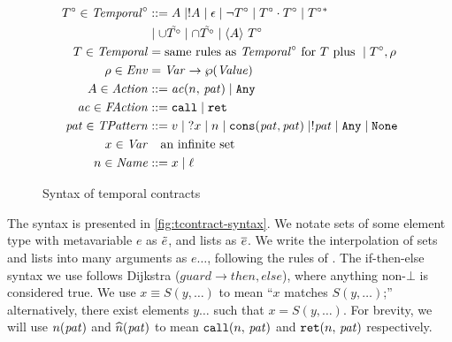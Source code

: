 \begin{figure}
  \begin{align*}
  T^\circ \in \mathit{Temporal}^\circ &::=
      A \mid ! A
 \mid \epsilon
 \mid \neg T^\circ
 \mid T^\circ \cdot T^\circ
 \mid T^\circ{}^* \\
&\mid \cup \tilde{T^\circ}
 \mid \cap \tilde{T^\circ}
 \mid \langle A\rangle\ T^\circ
\\
T \in \mathit{Temporal} &= \text{same rules as } \mathit{Temporal}^\circ \text{ for } T \text{ plus } \mid T^\circ, \rho \\
\rho \in \mathit{Env} &= \mathit{Var} \to \wp(\mathit{Value}) \\
A \in \mathit{Action} &::= \mathit{ac}(n,\, \mathit{pat}) \mid {\tt Any} \\
\mathit{ac} \in \mathit{FAction} &::= {\tt call} \mid {\tt ret} \\
\mathit{pat} \in \mathit{TPattern} &::= v \mid {\tt ?} x \mid n \mid {\tt cons}(\mathit{pat},\mathit{pat}) \mid ! \mathit{pat} \mid {\tt Any} \mid {\tt None} \\
x \in \mathit{Var} &\quad\text{an infinite set} \\
n \in \mathit{Name} &::= x \mid \ell
  \end{align*}
  \caption{Syntax of temporal contracts}
  \label{fig:tcontract-syntax}
\end{figure}

%
The syntax is presented in \autoref{fig:tcontract-syntax}.
%
%
We notate sets of some element type with metavariable $e$ as $\tilde{e}$, and lists as $\overline{e}$.
%
We write the interpolation of sets and lists into many arguments as $e\ldots$, following the rules of \citet{dvanhorn:Kohlbecker1987Macrobyexample}.
%
The if-then-else syntax we use follows Dijkstra ($\mathit{guard} \to \mathit{then}, \mathit{else}$), where anything non-$\bot$ is considered true.
%
We use $x\equiv S(y,\ldots)$ to mean ``$x$ matches $S(y,\ldots)$;'' alternatively, there exist elements $y\ldots$ such that $x = S(y,\ldots)$.
%
For brevity, we will use $n(\mathit{pat})$ and $\widehat{n}(\mathit{pat})$ to mean ${\tt call}(n,\, \mathit{pat})$ and ${\tt ret}(n,\, \mathit{pat})$ respectively.

